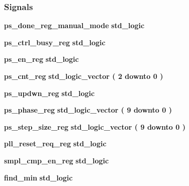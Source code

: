 \subsubsection*{Signals}
 \begin{DoxyCompactItemize}
\item 
{\bf ps\+\_\+done\+\_\+reg\+\_\+manual\+\_\+mode} {\bfseries \textcolor{comment}{std\+\_\+logic}\textcolor{vhdlchar}{ }} 
\item 
{\bf ps\+\_\+ctrl\+\_\+busy\+\_\+reg} {\bfseries \textcolor{comment}{std\+\_\+logic}\textcolor{vhdlchar}{ }} 
\item 
{\bf ps\+\_\+en\+\_\+reg} {\bfseries \textcolor{comment}{std\+\_\+logic}\textcolor{vhdlchar}{ }} 
\item 
{\bf ps\+\_\+cnt\+\_\+reg} {\bfseries \textcolor{comment}{std\+\_\+logic\+\_\+vector}\textcolor{vhdlchar}{ }\textcolor{vhdlchar}{(}\textcolor{vhdlchar}{ }\textcolor{vhdlchar}{ } \textcolor{vhdldigit}{2} \textcolor{vhdlchar}{ }\textcolor{keywordflow}{downto}\textcolor{vhdlchar}{ }\textcolor{vhdlchar}{ } \textcolor{vhdldigit}{0} \textcolor{vhdlchar}{ }\textcolor{vhdlchar}{)}\textcolor{vhdlchar}{ }} 
\item 
{\bf ps\+\_\+updwn\+\_\+reg} {\bfseries \textcolor{comment}{std\+\_\+logic}\textcolor{vhdlchar}{ }} 
\item 
{\bf ps\+\_\+phase\+\_\+reg} {\bfseries \textcolor{comment}{std\+\_\+logic\+\_\+vector}\textcolor{vhdlchar}{ }\textcolor{vhdlchar}{(}\textcolor{vhdlchar}{ }\textcolor{vhdlchar}{ } \textcolor{vhdldigit}{9} \textcolor{vhdlchar}{ }\textcolor{keywordflow}{downto}\textcolor{vhdlchar}{ }\textcolor{vhdlchar}{ } \textcolor{vhdldigit}{0} \textcolor{vhdlchar}{ }\textcolor{vhdlchar}{)}\textcolor{vhdlchar}{ }} 
\item 
{\bf ps\+\_\+step\+\_\+size\+\_\+reg} {\bfseries \textcolor{comment}{std\+\_\+logic\+\_\+vector}\textcolor{vhdlchar}{ }\textcolor{vhdlchar}{(}\textcolor{vhdlchar}{ }\textcolor{vhdlchar}{ } \textcolor{vhdldigit}{9} \textcolor{vhdlchar}{ }\textcolor{keywordflow}{downto}\textcolor{vhdlchar}{ }\textcolor{vhdlchar}{ } \textcolor{vhdldigit}{0} \textcolor{vhdlchar}{ }\textcolor{vhdlchar}{)}\textcolor{vhdlchar}{ }} 
\item 
{\bf pll\+\_\+reset\+\_\+req\+\_\+reg} {\bfseries \textcolor{comment}{std\+\_\+logic}\textcolor{vhdlchar}{ }} 
\item 
{\bf smpl\+\_\+cmp\+\_\+en\+\_\+reg} {\bfseries \textcolor{comment}{std\+\_\+logic}\textcolor{vhdlchar}{ }} 
\item 
{\bf find\+\_\+min} {\bfseries \textcolor{comment}{std\+\_\+logic}\textcolor{vhdlchar}{ }} 

\end{DoxyCompactItemize}
